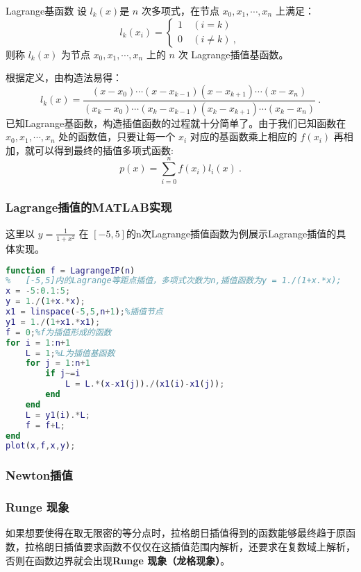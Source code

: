 \begin{definition}{Lagrange基函数}
设 $l_k(x)$是 $n$ 次多项式，在节点 $x_0, x_1,\cdots,x_n$ 上满足：
\begin{equation}
l_k(x_i) = 
\begin{cases}
1\ &(i = k)\\
0 \ &(i \neq k)~,
\end{cases}
\end{equation}
则称 $l_k(x)$ 为节点 $x_0,x_1,\cdots,x_n$ 上的 $n$ 次 Lagrange插值基函数。
\end{definition}
根据定义，由构造法易得：
\begin{equation}
l_k(x) = \frac{(x-x_0)\cdots(x-x_{k-1})(x-x_{k+1})\cdots (x-x_n)}{(x_k-x_0)\cdots(x_k-x_{k-1})(x_k-x_{k+1})\cdots(x_k-x_n)}~.
\end{equation}
已知Lagrange基函数，构造插值函数的过程就十分简单了。由于我们已知函数在 $x_0,x_1,\cdots,x_n$ 处的函数值，只要让每一个 $x_i$ 对应的基函数乘上相应的 $f(x_i)$ 再相加，就可以得到最终的插值多项式函数:
\begin{equation}
p(x) = \sum_{i = 0}^n f(x_i)l_i(x) ~.
\end{equation}
\subsubsection{Lagrange插值的MATLAB实现}
这里以 $y = \frac{1}{1+x^2}$ 在 $[-5,5]$的n次Lagrange插值函数为例展示Lagrange插值的具体实现。
\begin{lstlisting}[language=matlab]
function f = LagrangeIP(n)
%   [-5,5]内的Lagrange等距点插值，多项式次数为n,插值函数为y = 1./(1+x.*x);
x = -5:0.1:5;
y = 1./(1+x.*x);
x1 = linspace(-5,5,n+1);%插值节点
y1 = 1./(1+x1.*x1);
f = 0;%f为插值形成的函数
for i = 1:n+1
    L = 1;%L为插值基函数
    for j = 1:n+1
        if j~=i
            L = L.*(x-x1(j))./(x1(i)-x1(j));
        end
    end
    L = y1(i).*L;
    f = f+L;
end
plot(x,f,x,y);
\end{lstlisting}
\subsubsection{Newton插值}

\subsubsection{Runge 现象}
如果想要使得在取无限密的等分点时，拉格朗日插值得到的函数能够最终趋于原函数，拉格朗日插值要求函数不仅仅在这插值范围内解析，还要求在复数域上解析，否则在函数边界就会出现\textbf{Runge 现象（龙格现象）}。

